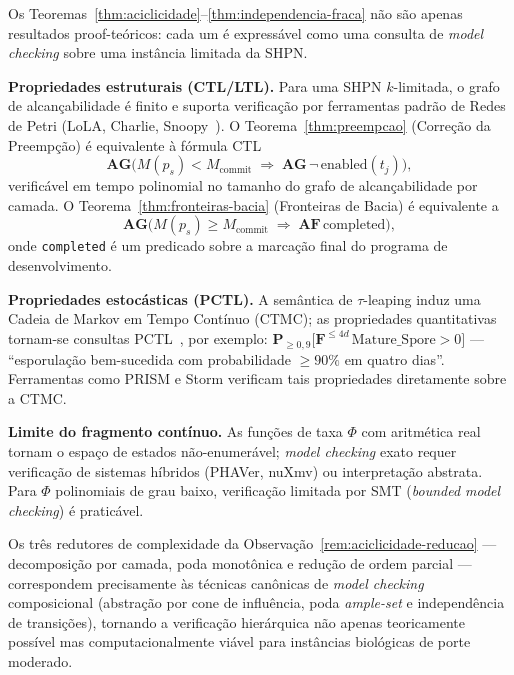 \begin{remark}
\label{rem:model-checking}
Os Teoremas~\ref{thm:aciclicidade}--\ref{thm:independencia-fraca} não são apenas
resultados proof-teóricos: cada um é expressável como uma consulta de
\emph{model checking} sobre uma instância limitada da SHPN.

\textbf{Propriedades estruturais (CTL/LTL).}  Para uma SHPN $k$-limitada, o
grafo de alcançabilidade é finito e suporta verificação por ferramentas padrão
de Redes de Petri (LoLA, Charlie, Snoopy~\cite{Koch2011}).  O
Teorema~\ref{thm:preempcao} (Correção da Preempção) é equivalente à fórmula
CTL
\[
  \mathbf{AG}\!\bigl(M(p_s) < M_{\mathrm{commit}}
  \;\Rightarrow\;
  \mathbf{AG}\,\neg\,\mathrm{enabled}(t_j)\bigr),
\]
verificável em tempo polinomial no tamanho do grafo de alcançabilidade por
camada.  O Teorema~\ref{thm:fronteiras-bacia} (Fronteiras de Bacia) é
equivalente a
\[
  \mathbf{AG}\!\bigl(M(p_s) \geq M_{\mathrm{commit}}
  \;\Rightarrow\;
  \mathbf{AF}\,\mathrm{completed}\bigr),
\]
onde \texttt{completed} é um predicado sobre a marcação final do programa
de desenvolvimento.

\textbf{Propriedades estocásticas (PCTL).}  A semântica de $\tau$-leaping
induz uma Cadeia de Markov em Tempo Contínuo (CTMC); as propriedades
quantitativas tornam-se consultas PCTL~\cite{Chaouiya2007}, por exemplo:
$\mathbf{P}_{\geq 0{,}9}\!\bigl[\mathbf{F}^{\leq 4d}\,\mathrm{Mature\_Spore}
> 0\bigr]$ --- ``esporulação bem-sucedida com probabilidade $\geq 90\%$ em
quatro dias''.  Ferramentas como PRISM e Storm verificam tais propriedades
diretamente sobre a CTMC.

\textbf{Limite do fragmento contínuo.}  As funções de taxa $\Phi$ com
aritmética real tornam o espaço de estados não-enumerável; \emph{model
checking} exato requer verificação de sistemas híbridos (PHAVer, nuXmv) ou
interpretação abstrata.  Para $\Phi$ polinomiais de grau baixo, verificação
limitada por SMT (\emph{bounded model checking}) é praticável.

Os três redutores de complexidade da
Observação~\ref{rem:aciclicidade-reducao} --- decomposição por camada,
poda monotônica e redução de ordem parcial --- correspondem precisamente
às técnicas canônicas de \emph{model checking} composicional (abstração por
cone de influência, poda \emph{ample-set} e independência de transições),
tornando a verificação hierárquica não apenas teoricamente possível mas
computacionalmente viável para instâncias biológicas de porte moderado.
\end{remark}

